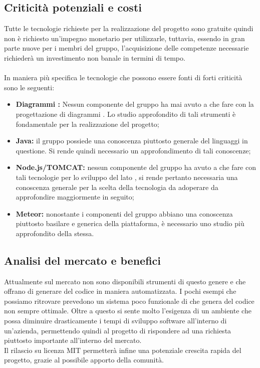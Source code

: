   \subsection{Criticità potenziali e costi}
    Tutte le tecnologie richieste per la realizzazione del progetto sono gratuite quindi non è richiesto
    un'impegno monetario per utilizzarle, tuttavia, essendo in gran parte nuove per i membri del gruppo,
    l'acquisizione delle competenze necessarie richiederà un investimento non banale in termini di
    tempo.
    \\ \\
    In maniera più specifica le tecnologie che possono essere fonti di forti criticità sono le seguenti:
      \begin{itemize}
        \item \textbf{Diagrammi :} Nessun componente del gruppo ha mai avuto a che fare con la progettazione di diagrammi . Lo studio approfondito di tali strumenti è fondamentale per la realizzazione del progetto;
        \item \textbf{Java:} il gruppo possiede una conoscenza piuttosto generale del linguaggi in questione. Si rende quindi necessario un approfondimento di tali conoscenze;
        \item \textbf{Node.js/TOMCAT:} nessun componente del gruppo ha avuto a che fare con tali tecnologie per lo sviluppo del lato , si rende pertanto necessaria una conoscenza
        generale per la scelta della tecnologia da adoperare da approfondire maggiormente in seguito;
        \item \textbf{Meteor:} nonostante i componenti del gruppo abbiano una conoscenza piuttosto basilare e generica della piattaforma, è necessario uno studio più approfondito della stessa.
      \end{itemize}
  \subsection{Analisi del mercato e benefici}
    Attualmente sul mercato non sono disponibili strumenti di questo genere e che offrano di generare del codice in maniera automatizzata. I pochi esempi che possiamo ritrovare
    prevedono un sistema poco funzionale di  che genera del codice non sempre ottimale.
    Oltre a questo si sente molto l'esigenza di un ambiente che possa diminuire drasticamente i tempi di sviluppo software all'interno di un'azienda, permettendo quindi al progetto
    di rispondere ad una richiesta piuttosto importante all'interno del mercato. \\
    Il rilascio su licenza MIT permetterà infine una potenziale crescita rapida del progetto, grazie al possibile apporto della comunità.
